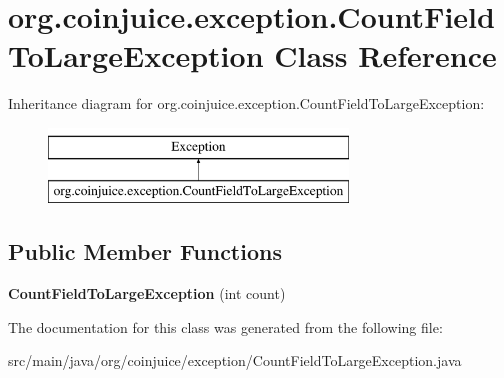 \hypertarget{classorg_1_1coinjuice_1_1exception_1_1_count_field_to_large_exception}{\section{org.\-coinjuice.\-exception.\-Count\-Field\-To\-Large\-Exception Class Reference}
\label{classorg_1_1coinjuice_1_1exception_1_1_count_field_to_large_exception}
}
Inheritance diagram for org.\-coinjuice.\-exception.\-Count\-Field\-To\-Large\-Exception\-:\begin{figure}[H]
\begin{center}
\leavevmode
\includegraphics[height=2.000000cm]{classorg_1_1coinjuice_1_1exception_1_1_count_field_to_large_exception}
\end{center}
\end{figure}
\subsection*{Public Member Functions}
\begin{DoxyCompactItemize}
\item 
\hypertarget{classorg_1_1coinjuice_1_1exception_1_1_count_field_to_large_exception_a1b50615ee1b0ecff9f66b424aeb9a916}{{\bfseries Count\-Field\-To\-Large\-Exception} (int count)}\label{classorg_1_1coinjuice_1_1exception_1_1_count_field_to_large_exception_a1b50615ee1b0ecff9f66b424aeb9a916}

\end{DoxyCompactItemize}


The documentation for this class was generated from the following file\-:\begin{DoxyCompactItemize}
\item 
src/main/java/org/coinjuice/exception/Count\-Field\-To\-Large\-Exception.\-java\end{DoxyCompactItemize}
